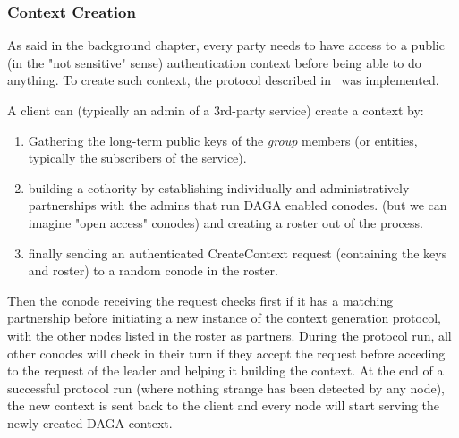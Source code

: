     \subsubsection{Context Creation}
    As said in the background chapter, every party needs to have access to a public (in the "not sensitive" sense)
    authentication context before being able to do anything.
    To create such context, the protocol described in~\cite[Sect.~4.7.3]{syta_identity_2015} was implemented. %

    A client can (typically an admin of a 3rd-party service)
    create a context by:
    \begin{enumerate}[leftmargin=!,itemsep=-1ex]
        \item Gathering the long-term public keys of the \emph{group} members (or entities, typically the subscribers of the service).

        \item building a cothority by establishing individually and administratively partnerships with the admins that run
        DAGA enabled conodes. (but we can imagine "open access" conodes) and creating a roster out of the  process.

        \item finally sending an authenticated CreateContext request (containing the keys and roster) to a random conode in the roster.
    \end{enumerate}

    Then the conode receiving the request checks first if it has a matching partnership before initiating a new instance of
    the context generation protocol, with the other nodes listed in the roster as partners.
    During the protocol run, all other conodes will check in their turn if they accept the request before acceding to the
    request of the leader and helping it building the context.
    At the end of a successful protocol run (where nothing strange has been detected by any node), the new context is sent
    back to the client and every node will start serving the newly created DAGA context.

